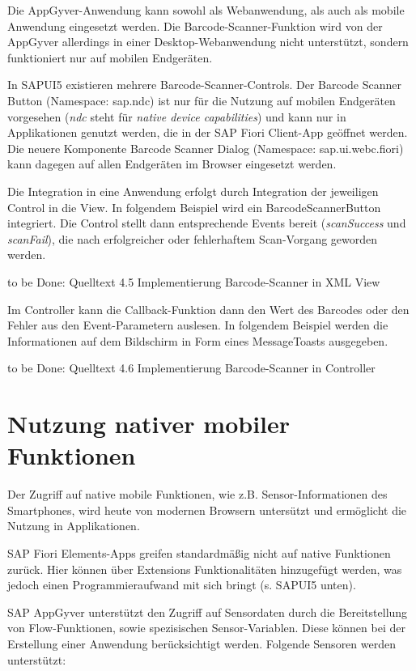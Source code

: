 Die AppGyver-Anwendung kann sowohl als Webanwendung, als auch als mobile Anwendung eingesetzt werden. Die Barcode-Scanner-Funktion wird von der AppGyver allerdings in einer Desktop-Webanwendung nicht unterstützt, sondern funktioniert nur auf mobilen Endgeräten.

In SAPUI5 existieren mehrere Barcode-Scanner-Controls.  Der Barcode Scanner Button (Namespace: sap.ndc) ist nur für die Nutzung auf mobilen Endgeräten vorgesehen (\textit{ndc} steht für \textit{native device capabilities}) und kann nur in Applikationen genutzt werden, die in der SAP Fiori Client-App geöffnet werden. Die neuere Komponente Barcode Scanner Dialog (Namespace: sap.ui.webc.fiori) kann dagegen auf allen Endgeräten im Browser eingesetzt werden.

Die Integration in eine Anwendung erfolgt durch Integration der jeweiligen Control in die View. In folgendem Beispiel wird ein BarcodeScannerButton integriert. Die Control stellt dann entsprechende Events bereit (\textit{scanSuccess} und \textit{scanFail}), die nach erfolgreicher oder fehlerhaftem Scan-Vorgang geworden werden. 

to be Done: Quelltext 4.5 Implementierung Barcode-Scanner in XML View

Im Controller kann die Callback-Funktion dann den Wert des Barcodes oder den Fehler aus den Event-Parametern auslesen. In folgendem Beispiel werden die Informationen auf dem Bildschirm in Form eines MessageToasts ausgegeben. 

to be Done: Quelltext 4.6 Implementierung Barcode-Scanner in Controller

\section{Nutzung nativer mobiler Funktionen}

Der Zugriff auf native mobile Funktionen, wie z.B. Sensor-Informationen des Smartphones, wird heute von modernen Browsern untersützt und ermöglicht die Nutzung in Applikationen.

SAP Fiori Elements-Apps greifen standardmäßig nicht auf native Funktionen zurück. Hier können über Extensions Funktionalitäten hinzugefügt werden, was jedoch einen Programmieraufwand mit sich bringt (s. SAPUI5 unten).

SAP AppGyver unterstützt den Zugriff auf Sensordaten durch die Bereitstellung von Flow-Funktionen, sowie spezisischen Sensor-Variablen. Diese können bei der Erstellung einer Anwendung berücksichtigt werden. Folgende Sensoren werden unterstützt:

